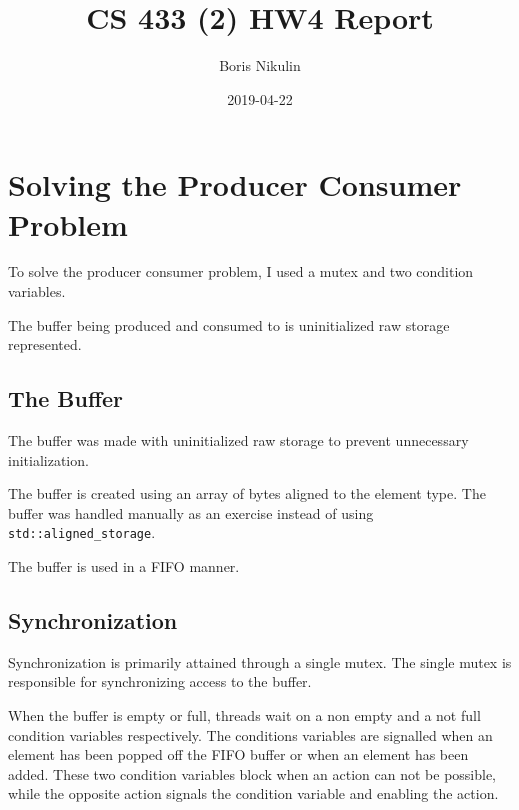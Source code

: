 \documentclass{article}
\title{CS 433 (2) HW4 Report}
\date{2019-04-22}
\author{Boris Nikulin}
\begin{document}
\maketitle
\tableofcontents

\section{Solving the Producer Consumer Problem}

To solve the producer consumer problem,
I used a mutex and two condition variables.

The buffer being produced and consumed to
is uninitialized raw storage represented.


\subsection{The Buffer}

The buffer was made with uninitialized raw storage to
prevent unnecessary initialization.

The buffer is created using an array of bytes aligned to the element type.
The buffer was handled manually as an exercise instead of using \texttt{std::aligned\_storage}.

The buffer is used in a FIFO manner.


\subsection{Synchronization}

Synchronization is primarily attained through a single mutex.
The single mutex is responsible for synchronizing access to the buffer.

When the buffer is empty or full,
threads wait on a non empty and a not full condition variables respectively.
The conditions variables are signalled when
an element has been popped off the FIFO buffer or
when an element has been added.
These two condition variables block when an action can not be possible,
while the opposite action signals the condition variable and enabling the action.
\end{document}
